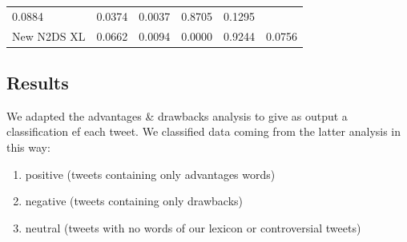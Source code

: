 \documentclass[]{book}
\providecommand{\tightlist}{%
  \setlength{\itemsep}{0pt}\setlength{\parskip}{0pt}}
\begin{document}
\begin{longtable}[]{@{}lrrrrr@{}}
\begin{minipage}[t]{0.12\columnwidth}
0.0884\strut
\end{minipage} & \begin{minipage}[t]{0.12\columnwidth}\raggedleft\strut
0.0374\strut
\end{minipage} & \begin{minipage}[t]{0.16\columnwidth}\raggedleft\strut
0.0037\strut
\end{minipage} & \begin{minipage}[t]{0.19\columnwidth}\raggedleft\strut
0.8705\strut
\end{minipage} & \begin{minipage}[t]{0.17\columnwidth}\raggedleft\strut
0.1295\strut
\end{minipage}\tabularnewline
\begin{minipage}[t]{0.09\columnwidth}\raggedright\strut
New N2DS XL\strut
\end{minipage} & \begin{minipage}[t]{0.12\columnwidth}\raggedleft\strut
0.0662\strut
\end{minipage} & \begin{minipage}[t]{0.12\columnwidth}\raggedleft\strut
0.0094\strut
\end{minipage} & \begin{minipage}[t]{0.16\columnwidth}\raggedleft\strut
0.0000\strut
\end{minipage} & \begin{minipage}[t]{0.19\columnwidth}\raggedleft\strut
0.9244\strut
\end{minipage} & \begin{minipage}[t]{0.17\columnwidth}\raggedleft\strut
0.0756\strut
\end{minipage}\tabularnewline
\bottomrule
\end{longtable}

\subsection{Results}\label{results-9}

We adapted the advantages \& drawbacks analysis to give as output a
classification ef each tweet. We classified data coming from the latter
analysis in this way:

\begin{enumerate}
\def\labelenumi{\arabic{enumi}.}
\tightlist
\item
  positive (tweets containing only advantages words)
\item
  negative (tweets containing only drawbacks)
\item
  neutral (tweets with no words of our lexicon or controversial tweets)
\end{enumerate}
\end{document}
